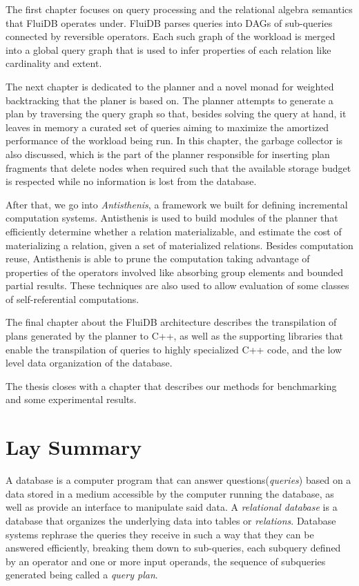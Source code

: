 \begin{precontent}
The first chapter focuses on query processing and the relational algebra semantics that FluiDB operates under. FluiDB parses queries into DAGs of sub-queries connected by reversible operators. Each such graph of the workload is merged into a global query graph that is used to infer properties of each relation like cardinality and extent.

The next chapter is dedicated to the planner and a novel monad for weighted backtracking that the planer is based on. The planner attempts to generate a plan by traversing the query graph so that, besides solving the query at hand, it leaves in memory a curated set of queries aiming to maximize the amortized performance of the workload being run. In this chapter, the garbage collector is also discussed, which is the part of the planner responsible for inserting plan fragments that delete nodes when required  such that the available storage budget is respected while no information is lost from the database.

After that, we go into \emph{Antisthenis}, a framework we built for defining incremental computation systems. Antisthenis is used to build modules of the planner that efficiently determine whether a relation materializable, and estimate the cost of materializing a relation, given a set of materialized relations. Besides computation reuse, Antisthenis is able to prune the computation taking advantage of properties of the operators involved like absorbing group elements  and bounded partial results. These techniques are also used to allow evaluation of some classes of self-referential computations.

The final chapter about the FluiDB architecture describes the transpilation of plans generated by the planner to C++, as well as the supporting libraries that enable the transpilation of queries to highly specialized C++ code, and the low level data organization of the database. 

The thesis closes with a chapter that describes our methods for benchmarking and some experimental results.

\chapter{Lay Summary}%

A database is a computer program that can answer questions(\emph{queries}) based on a data stored in a medium accessible by the computer running the database, as well as provide an interface to manipulate said data. A \emph{relational database} is a database that organizes the underlying data into tables or \emph{relations}. Database systems rephrase the queries they receive in such a way that they can be answered efficiently, breaking them down to sub-queries, each subquery defined by an operator and one or more input operands, the sequence of subqueries generated being called a \emph{query plan}.


\end{precontent}

